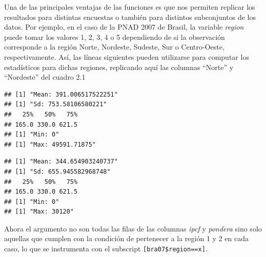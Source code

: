 \documentclass[
]{book}
\newenvironment{Shaded}{\begin{snugshade}}{\end{snugshade}}
\newcommand{\DecValTok}[1]{\textcolor[rgb]{0.00,0.00,0.81}{#1}}
\newcommand{\FunctionTok}[1]{\textcolor[rgb]{0.00,0.00,0.00}{#1}}
\newcommand{\NormalTok}[1]{#1}
\newcommand{\SpecialCharTok}[1]{\textcolor[rgb]{0.00,0.00,0.00}{#1}}
\begin{document}
Una de las principales ventajas de las funciones es que nos permiten replicar los resultados para distintas encuestas o también para distintos subconjuntos de los datos. Por ejemplo, en el caso de la PNAD 2007 de Brasil, la variable \emph{region} puede tomar los valores 1, 2, 3, 4 o 5 dependiendo de si la observación corresponde a la región Norte, Nordeste, Sudeste, Sur o Centro-Oeste, respectivamente. Así, las líneas siguientes pueden utilizarse para computar los estadísticos para dichas regiones, replicando aquí las columnas ``Norte'' y ``Nordeste'' del cuadro 2.1

\begin{Shaded}
\end{Shaded}

\begin{verbatim}
## [1] "Mean: 391.006517522251"
## [1] "Sd: 753.58106580221"
##   25%   50%   75% 
## 165.0 330.0 621.5 
## [1] "Min: 0"
## [1] "Max: 49591.71875"
\end{verbatim}

\begin{Shaded}
\end{Shaded}

\begin{verbatim}
## [1] "Mean: 344.654903240737"
## [1] "Sd: 655.945582968748"
##   25%   50%   75% 
## 165.0 330.0 621.5 
## [1] "Min: 0"
## [1] "Max: 30120"
\end{verbatim}

Ahora el argumento no son todas las filas de las columnas \emph{ipcf} y \emph{pondera} sino solo aquellas que cumplen con la condición de pertenecer a la región 1 y 2 en cada caso, lo que se instrumenta con el subscript \texttt{{[}bra07\$region==x{]}}.
\end{document}
